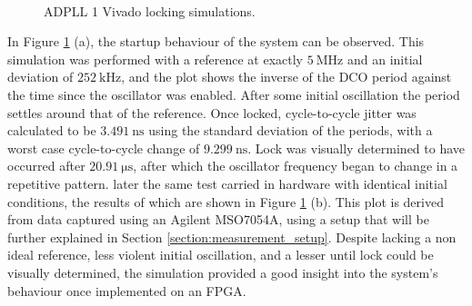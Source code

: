 \begin{figure}[h]
	\centering
	\\
	\caption[\ac{ADPLL} 1 Vivado locking simulations]{\ac{ADPLL} 1 Vivado locking simulations.}
	\label{fig:sim_locking}
\end{figure}
In Figure \ref{fig:sim_locking} (a), the startup behaviour of the system can be observed. This simulation was performed with a reference at exactly $5~\si{\mega\hertz}$ and an initial deviation of $252~\si{\kilo\hertz}$, and the plot shows the inverse of the \ac{DCO} period against the time since the oscillator was enabled. After some initial oscillation the period settles around that of the reference. Once locked, cycle-to-cycle jitter was calculated to be $3.491~\si{\nano\second}$ using the standard deviation of the periods, with a worst case cycle-to-cycle change of $9.299~\si{\nano\second}$. Lock was visually determined to have occurred after $20.91~\si{\micro\second}$, after which the oscillator frequency began to change in a repetitive pattern. later the same test carried in hardware with identical initial conditions, the results of which are shown in Figure \ref{fig:sim_locking} (b). This plot is derived from data captured using an Agilent MSO7054A, using a setup that will be further explained in Section \ref{section:measurement_setup}. Despite lacking a non ideal reference, less violent initial oscillation, and a lesser until lock could be visually determined, the simulation provided a good insight into the system's behaviour once implemented on an \ac{FPGA}.



